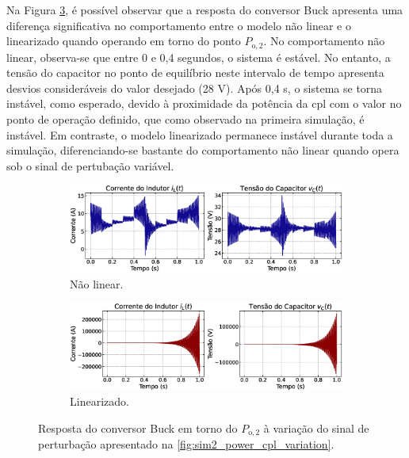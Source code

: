 Na Figura \ref{fig:simulation2_op2}, é possível observar que a resposta do conversor Buck apresenta uma diferença significativa no comportamento entre o modelo não linear e o linearizado quando operando em torno do ponto $P_{\mathrm{o}, 2}$. No comportamento não linear, observa-se que entre 0 e 0,4 segundos, o sistema é estável. No entanto, a tensão do capacitor no ponto de equilíbrio neste intervalo de tempo apresenta desvios consideráveis do valor desejado (28 V). Após 0,4 s, o sistema se torna instável, como esperado, devido à proximidade da potência da \acrshort{cpl} com o valor no ponto de operação definido, que como observado na primeira simulação, é instável. Em contraste, o modelo linearizado permanece instável durante toda a simulação, diferenciando-se bastante do comportamento não linear quando opera sob o sinal de pertubação variável.

\begin{figure}[ht]
  \centering
  \captionsetup{justification=centering}
  \begin{subfigure}{1.\textwidth}
    \centering
    \includegraphics[width=1.\textwidth]{figuras/buck/sim2/op2/result_nonlinear.eps}
    \caption{Não linear.}
    \label{fig:sim2_op2_nonlinear}
  \end{subfigure}
  \newline
  \begin{subfigure}{1.\textwidth}
    \centering
    \includegraphics[width=1.\textwidth]{figuras/buck/sim2/op2/result_linear.eps}
    \caption{Linearizado.}
    \label{fig:simulation2_op2_linear}
  \end{subfigure}
  \caption{Resposta do conversor Buck em torno do $P_{\mathrm{o}, 2}$ à variação do sinal de perturbação apresentado na \autoref{fig:sim2_power_cpl_variation}.}
  \label{fig:simulation2_op2}
\end{figure}


